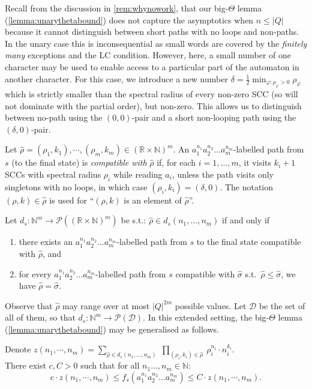\documentclass[10pt,a4paper]{amsart}
\numberwithin{equation}{section}
\theoremstyle{plain}
\theoremstyle{definition}
\theoremstyle{remark}
\newcommand\z[1]{z(#1)}
\newcommand\dgf{d}
\newcommand{\scc}{\varphi}
\renewcommand\nu{f}
\begin{document}
Recall from the discussion in \cref{rem:whynowork}, that our big-$\Theta$ lemma (\cref{lemma:unarythetabound}) does not capture the asymptotics when $n \le |Q|$ because it cannot distinguish between short paths with no loops and non-paths. In the unary case this is inconsequential as small words are covered by the \textit{finitely many} exceptions and the LC condition. However, here, a small number of one character may be used to enable access to a particular part of the automaton in another character. For this case, we introduce a new number $\delta= \frac{1}{2}\min_{\scc{} : \rho_\scc{} > 0} \rho_\scc{}$ which is strictly smaller than the spectral radius of every non-zero SCC (so will not dominate with the partial order), but non-zero. This allows us to distinguish between no-path using the $(0,0)$-pair and a short non-looping path using the $(\delta,0)$-pair.

\begin{defi}
\label{def:boundedcompat}
Let $\hat{\rho}= (\rho_1,k_1), \cdots, (\rho_m,k_m)\in (\mathbb{R} \times \mathbb{N})^m$.
An $a_1^{n_1}a_2^{n_2}\dots a_m^{n_m}$-labelled path from $s$ (to the final state) is \emph{compatible with} $\hat{\rho}$
if, for each $i = 1,\dots, m$, it visits $k_i + 1$ SCCs with spectral radius $\rho_i$ while reading $a_i$, unless the path visits only singletons with no loops, in which case $(\rho_i,k_i) = (\delta,0)$. The notation $(\rho,k)\in \hat{\rho}$ is used for ``$(\rho,k)$ is an element of  $\hat{\rho}$''.
\end{defi}
\begin{defi}
\label{def:boundeddegree}
Let $\dgf_{s} : \mathbb{N}^m \to \mathcal{P}((\mathbb{R} \times \mathbb{N})^m)$ be s.t.:
$\hat{\rho}\in \dgf_s(n_1,\dots,n_m) $ if and only if
\begin{enumerate}[(1)]
\item there exists an  $a_1^{n_1}a_2^{n_2}\dots a_m^{n_m}$-labelled path from $s$ to the final state compatible with $\hat{\rho}$, and
\item for every $a_1^{n_1}a_2^{n_2}\dots a_m^{n_m}$-labelled path from $s$ compatible with $\hat{\sigma}$ s.t.\ $\hat{\rho}\le\hat{\sigma}$, we have $\hat{\rho}=\hat{\sigma}$.
\end{enumerate}
\end{defi}

\noindent Observe that $\hat{\rho}$ may range over at most $|Q|^{2m}$ possible values. Let $\mathcal{D}$ be the set of all of them, so that $\dgf_{s}: \mathbb{N}^m \to \mathcal{P}(\mathcal{D})$.
In this extended setting, the big-$\Theta$ lemma (\cref{lemma:unarythetabound}) may be generalised as follows.
\begin{lem} \label{lemma:thetaletterbounded}
Denote $\z{n_1,\cdots,n_m} =  \sum_{\hat{\rho}\in \dgf_s(n_1,\dots,n_m)}\; \prod_{(\rho_i,k_i) \in \hat{\rho}} \ \rho_i^{n_i} \cdot n_i^{k_i}.$\\
There exist $c,C > 0$ such that for all $n_1\dots,n_m\in \mathbb{N}$:
\[
c\cdot \z{n_1,\cdots,n_m} \le  \nu_s(a_1^{n_1}a_2^{n_2}\dots a_m^{n_m}) \le C\cdot \z{n_1,\cdots,n_m}.
\]
\end{lem}
\end{document}
